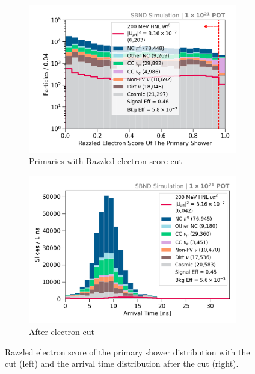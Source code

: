 \begin{figure}[bp!]
        \begin{subfigure}[b]{0.495\textwidth}   
            \centering 
            \includegraphics[width=\textwidth]{razzled_electron_score_prim_shw_precut}
            \caption{Primaries with Razzled electron score cut}%
            \label{fig:nrazzled_electron_full}
        \end{subfigure}
        \hfill
        \begin{subfigure}[b]{0.495\textwidth}   
            \centering 
            \includegraphics[width=\textwidth]{beam_bucket_postelectron}
            \caption{After electron cut}%
            \label{fig:bb_post_electron}
        \end{subfigure}
	\caption[Electron Cut]{
		Razzled electron score of the primary shower distribution with the cut (left) and the arrival time distribution after the cut (right). 
	}
        \label{fig:razzled_electron_cut}
\end{figure}

